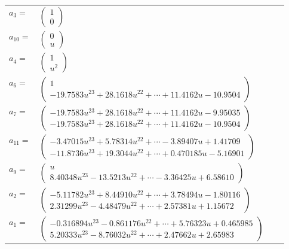 \documentclass[1p]{elsarticle_modified}
\theoremstyle{definition}
\begin{document}
\begin{tabular}{m{7pt} m{180pt} m{7pt} m{180pt} }
\flushright $a_{3}=$&$\begin{pmatrix}1\\0\end{pmatrix}$ \\
\flushright $a_{10}=$&$\begin{pmatrix}0\\u\end{pmatrix}$ \\
\flushright $a_{4}=$&$\begin{pmatrix}1\\u^2\end{pmatrix}$ \\
\flushright $a_{6}=$&$\begin{pmatrix}1\\-19.7583 u^{23}+28.1618 u^{22}+\cdots+11.4162 u-10.9504\end{pmatrix}$ \\
\flushright $a_{7}=$&$\begin{pmatrix}-19.7583 u^{23}+28.1618 u^{22}+\cdots+11.4162 u-9.95035\\-19.7583 u^{23}+28.1618 u^{22}+\cdots+11.4162 u-10.9504\end{pmatrix}$ \\
\flushright $a_{11}=$&$\begin{pmatrix}-3.47015 u^{23}+5.78314 u^{22}+\cdots-3.89407 u+1.41709\\-11.8736 u^{23}+19.3044 u^{22}+\cdots+0.470185 u-5.16901\end{pmatrix}$ \\
\flushright $a_{9}=$&$\begin{pmatrix}u\\8.40348 u^{23}-13.5213 u^{22}+\cdots-3.36425 u+6.58610\end{pmatrix}$ \\
\flushright $a_{2}=$&$\begin{pmatrix}-5.11782 u^{23}+8.44910 u^{22}+\cdots+3.78494 u-1.80116\\2.31299 u^{23}-4.48479 u^{22}+\cdots+2.57381 u+1.15672\end{pmatrix}$ \\
\flushright $a_{1}=$&$\begin{pmatrix}-0.316894 u^{23}-0.861176 u^{22}+\cdots+5.76323 u+0.465985\\5.20333 u^{23}-8.76032 u^{22}+\cdots+2.47662 u+2.65983\end{pmatrix}$ \\

\end{tabular}
\end{document}
